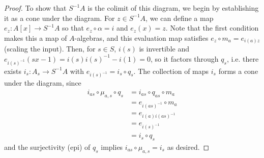 \documentclass[12pt]{exam}
\begin{document}
\begin{proof}
	To show that $S^{-1}A$ is the colimit of this diagram, we begin by establishing it as a cone under the diagram. For $z \in S^{-1}A$, we can define a map $e_z : A[x] \to S^{-1}A$ so that $e_z \circ \alpha = i$ and $e_z(x) = z$. Note that the first condition makes this a map of $A$-algebras, and this evaluation map satisfies $e_z \circ m_a = e_{i(a)z}$ (scaling the input). Then, for $s \in S$, $i(s)$ is invertible and $e_{i(s)^{-1}}(sx-1) = i(s)i(s)^{-1}-i(1) = 0$, so it factors through $q_s$, i.e. there exists $i_s : A_s \to S^{-1}A$ with $e_{i(s)^{-1}} = i_s \circ q_s$. The collection of maps $i_s$ forms a cone under the diagram, since
	\begin{align*}
	i_{as} \circ \mu_{a,s} \circ q_s
		&= i_{as} \circ q_{as} \circ m_a \\
		&= e_{i(as)^{-1}} \circ m_a \\
		&= e_{i(a)i(as)^{-1}} \\
		&= e_{i(s)^{-1}} \\
		&= i_s \circ q_s
	\end{align*}
	and the surjectivity (epi) of $q_s$ implies $i_{as} \circ \mu_{a,s} = i_s$ as desired.
	

\end{proof}
\end{document}
